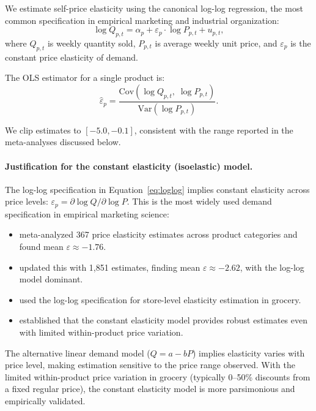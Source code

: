\documentclass[11pt,a4paper]{article}
\begin{document}
We estimate self-price elasticity using the canonical log-log regression, the most common specification in empirical marketing and industrial organization:
\begin{equation}
\log Q_{p,t} = \alpha_p + \varepsilon_p \cdot \log P_{p,t} + u_{p,t},
\label{eq:loglog}
\end{equation}
where $Q_{p,t}$ is weekly quantity sold, $P_{p,t}$ is average weekly unit price, and $\varepsilon_p$ is the constant price elasticity of demand.

The OLS estimator for a single product is:
\begin{equation}
\hat{\varepsilon}_p = \frac{\text{Cov}(\log Q_{p,t},\; \log P_{p,t})}{\text{Var}(\log P_{p,t})}.
\end{equation}

We clip estimates to $[-5.0, -0.1]$, consistent with the range reported in the meta-analyses discussed below.

\paragraph{Justification for the constant elasticity (isoelastic) model.}
The log-log specification in Equation~\eqref{eq:loglog} implies constant elasticity across price levels:
$\varepsilon_p = \partial \log Q / \partial \log P$.
This is the most widely used demand specification in empirical marketing science:
\begin{itemize}
    \item \citet{tellis1988} meta-analyzed 367 price elasticity estimates across product categories and found mean $\varepsilon \approx -1.76$.
    \item \citet{bijmolt2005} updated this with 1,851 estimates, finding mean $\varepsilon \approx -2.62$, with the log-log model dominant.
    \item \citet{hoch1995} used the log-log specification for store-level elasticity estimation in grocery.
    \item \citet{sethuraman1999} established that the constant elasticity model provides robust estimates even with limited within-product price variation.
\end{itemize}

The alternative linear demand model ($Q = a - bP$) implies elasticity varies with price level, making estimation sensitive to the price range observed.
With the limited within-product price variation in grocery (typically 0--50\% discounts from a fixed regular price), the constant elasticity model is more parsimonious and empirically validated.
\end{document}
